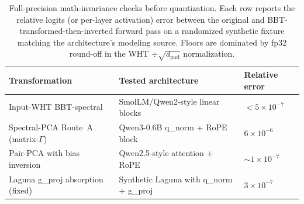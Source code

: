 \documentclass[11pt]{article}
\begin{document}
\begin{table}[h]
\centering
\small
\caption{Full-precision math-invariance checks before quantization. Each row reports the relative logits (or per-layer activation) error between the original and BBT-transformed-then-inverted forward pass on a randomized synthetic fixture matching the architecture's modeling source. Floors are dominated by fp32 round-off in the WHT $\div \sqrt{d_{\text{pad}}}$ normalization.}
\label{tab:invariance}
\begin{tabular}{lll}
\toprule
Transformation & Tested architecture & Relative error \\
\midrule
Input-WHT BBT-spectral & SmolLM/Qwen2-style linear blocks & $< 5\times 10^{-7}$ \\
Spectral-PCA Route~A (matrix-$\Gamma$) & Qwen3-0.6B q\_norm + RoPE block & $6\times 10^{-6}$ \\
Pair-PCA with bias inversion & Qwen2.5-style attention + RoPE & $\sim 1\times 10^{-7}$ \\
Laguna g\_proj absorption (fixed) & Synthetic Laguna with q\_norm + g\_proj & $3\times 10^{-7}$ \\
\bottomrule
\end{tabular}
\end{table}
\end{document}

